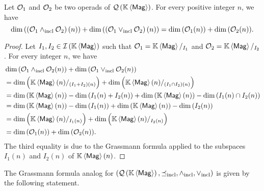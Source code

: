 \begin{Lemma}
    \label{lem:lattice_structure_and_coefficients_of_Hiblert_series}
    Let $\Oca_1$ and $\Oca_2$ be two operads of $\QMag$. For every
    positive integer $n$, we have
    \begin{equation}
    \label{equ:lattice_structure_and_coefficients_of_the_Hiblert_series}
        \dim{\left(\left(\Oca_1\InfQMag\Oca_2\right)(n)\right)}+
        \dim{\left(\left(\Oca_1\SupQMag\Oca_2\right)(n)\right)}=
        \dim{\left(\Oca_1(n)\right)}+\dim{\left(\Oca_2(n)\right)}.
    \end{equation}
\end{Lemma}
\begin{proof}
    Let $I_1, I_2 \in \IMag$ such that $\Oca_1 = \KMag/_{I_1}$ and
    $\Oca_2 = \KMag/_{I_2}$. For every integer $n$, we have
    \begin{equation}\begin{split}
        &\dim{\left(\Oca_1\InfQMag\Oca_2(n)\right)}+
            \dim{\left(\Oca_1\SupQMag\Oca_2(n)\right)}\\
        &=\dim{\Big(\KMag(n)/_{\left(I_1+I_2\right)(n)}\Big)}+
            \dim{\Big(\KMag(n)/_{\left(I_1\cap I_2\right)(n)}\Big)}\\
        &=\dim{\left(\KMag(n)\right)}-\dim{\left(I_1(n)+I_2(n)\right)}
            +\dim{\left(\KMag(n)\right)}
            -\dim{\left(I_1(n)\cap I_2(n)\right)} \\
        &=\dim{\left(\KMag(n)\right)}-\dim{\left(I_1(n)\right)}
            + \dim{\left(\KMag(n)\right)}-\dim{\left(I_2(n)\right)}\\
        &=\dim{\Big(\KMag(n)/_{I_1(n)}\Big)}
            +\dim{\Big(\KMag(n)/_{I_2(n)}\Big)}\\
        &=\dim{\left(\Oca_1(n)\right)}+\dim{\left(\Oca_2(n)\right)}.
    \end{split}\end{equation}
    The third equality is due to the Grassmann formula applied to the
    subspaces $I_1(n)$ and $I_2(n)$ of $\KMag(n)$.
\end{proof}
\medbreak

The Grassmann formula analog for $\LatQMag$ is given by the following
statement.
\medbreak

